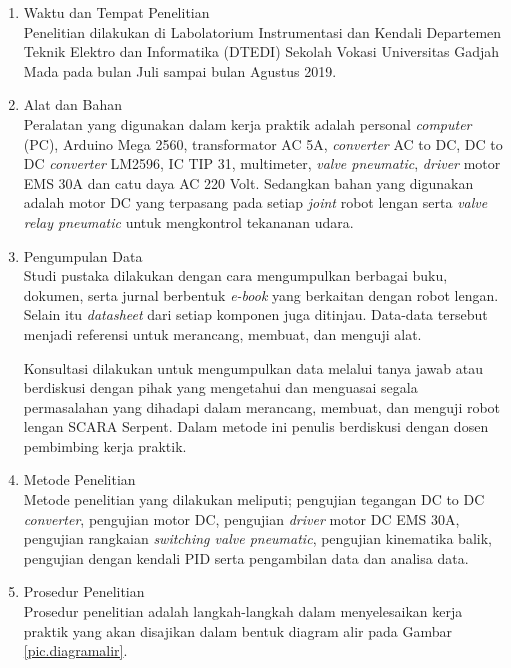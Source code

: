 \begin{enumerate}
	\item Waktu dan Tempat Penelitian \\
	Penelitian dilakukan di Labolatorium Instrumentasi dan Kendali Departemen Teknik Elektro dan Informatika (DTEDI) Sekolah Vokasi Universitas Gadjah Mada pada bulan Juli sampai bulan Agustus 2019.
	
	\item Alat dan Bahan \\
	Peralatan yang digunakan dalam kerja praktik adalah personal \textit{computer} (PC), Arduino Mega 2560, transformator AC 5A, \textit{converter} AC to DC, DC to DC \textit{converter} LM2596, IC TIP 31, multimeter,\textit{ valve pneumatic}, \textit{driver} motor EMS 30A dan catu daya AC 220 Volt. Sedangkan bahan yang digunakan adalah motor DC yang terpasang pada setiap \emph {joint} robot lengan serta \textit{valve relay pneumatic} untuk mengkontrol tekananan udara.
	
	\item  Pengumpulan Data \\
	Studi pustaka dilakukan dengan cara mengumpulkan berbagai buku, dokumen, serta jurnal berbentuk \emph{e-book} yang berkaitan dengan robot lengan. Selain itu \emph{datasheet} dari setiap komponen juga ditinjau. Data-data tersebut menjadi referensi untuk merancang, membuat, dan menguji alat. 
	
	Konsultasi dilakukan untuk mengumpulkan data melalui tanya jawab atau berdiskusi dengan pihak yang mengetahui dan menguasai segala permasalahan yang dihadapi dalam merancang, membuat, dan menguji robot lengan SCARA Serpent. Dalam metode ini penulis berdiskusi dengan dosen pembimbing kerja praktik. 
	
	\item Metode Penelitian \\
	Metode penelitian yang dilakukan meliputi; pengujian tegangan DC to DC \textit{converter}, pengujian motor DC, pengujian \textit{driver} motor DC EMS 30A, pengujian rangkaian \textit{switching valve pneumatic}, pengujian kinematika balik, pengujian dengan kendali PID serta pengambilan data dan analisa data.
	
	\item Prosedur Penelitian\\
	Prosedur penelitian adalah langkah-langkah dalam menyelesaikan kerja praktik yang akan disajikan dalam bentuk diagram alir pada Gambar \ref{pic.diagramalir}.
	

\end{enumerate}
